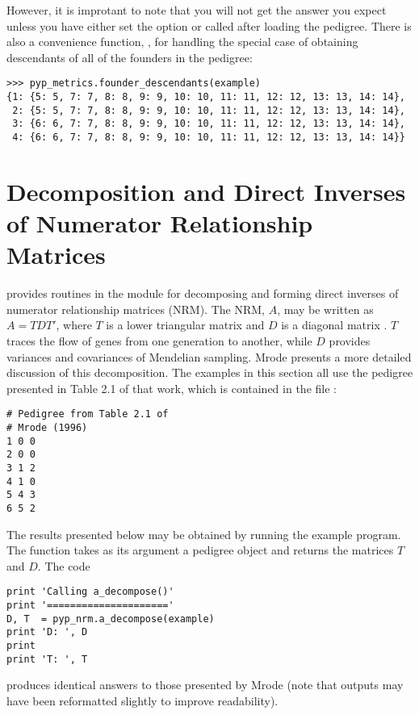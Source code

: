 However, it is improtant to note that you will not get the answer you expect unless you have either set the option  or called  after loading the pedigree. There is also a convenience function, , for handling the special case of obtaining descendants of all of the founders in the pedigree:
\begin{verbatim}
>>> pyp_metrics.founder_descendants(example)
{1: {5: 5, 7: 7, 8: 8, 9: 9, 10: 10, 11: 11, 12: 12, 13: 13, 14: 14},
 2: {5: 5, 7: 7, 8: 8, 9: 9, 10: 10, 11: 11, 12: 12, 13: 13, 14: 14},
 3: {6: 6, 7: 7, 8: 8, 9: 9, 10: 10, 11: 11, 12: 12, 13: 13, 14: 14},
 4: {6: 6, 7: 7, 8: 8, 9: 9, 10: 10, 11: 11, 12: 12, 13: 13, 14: 14}}
\end{verbatim}
\section{Decomposition and Direct Inverses of Numerator Relationship Matrices}\label{sec:computing-decomposition}
\PyPedal{} provides routines in the  module for decomposing and forming direct inverses of numerator relationship matrices (NRM). The NRM, $A$, may be written as $A=TDT'$, where $T$ is a lower triangular matrix and $D$ is a diagonal matrix \cite{ref143,ref1060}. $T$ traces the flow of genes from one generation to another, while $D$ provides variances and covariances of Mendelian sampling. Mrode \citeyear{ref224} presents a more detailed discussion of this decomposition. The examples in this section all use the pedigree presented in Table 2.1 of that work, which is contained in the file :
\begin{verbatim}
# Pedigree from Table 2.1 of
# Mrode (1996)
1 0 0
2 0 0
3 1 2
4 1 0
5 4 3
6 5 2
\end{verbatim}
The results presented below may be obtained by running the  example program. The  function takes as its argument a pedigree object and returns the matrices $T$ and $D$. The code
\begin{verbatim}
print 'Calling a_decompose()'
print '====================='
D, T  = pyp_nrm.a_decompose(example)
print 'D: ', D
print
print 'T: ', T
\end{verbatim}
produces identical answers to those presented by Mrode \citeyear{ref224} (note that outputs may have been reformatted slightly to improve readability).
